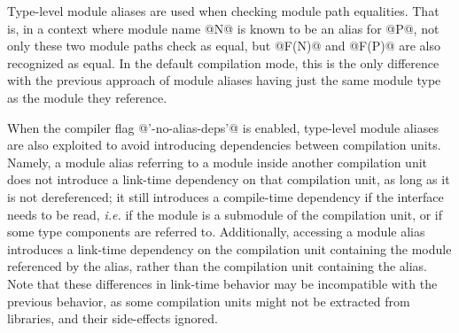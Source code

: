 Type-level module aliases are used when checking module path
equalities. That is, in a context where module name @N@ is known to be
an alias for @P@, not only these two module paths check as equal, but
@F(N)@ and @F(P)@ are also recognized as equal. In the default
compilation mode, this is the only difference with the previous
approach of module aliases having just the same module type as the
module they reference.

When the compiler flag @'-no-alias-deps'@ is enabled, type-level
module aliases are also exploited to avoid introducing dependencies
between compilation units. Namely, a module alias referring to a
module inside another compilation unit does not introduce a link-time
dependency on that compilation unit, as long as it is not
dereferenced; it still introduces a compile-time dependency if the
interface needs to be read, {\em i.e.}  if the module is a submodule
of the compilation unit, or if some type components are referred to.
Additionally, accessing a module alias introduces a link-time
dependency on the compilation unit containing the module referenced by
the alias, rather than the compilation unit containing the alias.
Note that these differences in link-time behavior may be incompatible
with the previous behavior, as some compilation units might not be
extracted from libraries, and their side-effects ignored.

